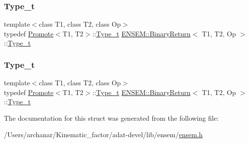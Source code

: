 \mbox{\label{structENSEM_1_1BinaryReturn_a8e4e01e2c9cd832cfe1a41a67305ac06}} 
\subsubsection{\texorpdfstring{Type\_t}{Type\_t}\hspace{0.1cm}{\footnotesize\ttfamily [2/3]}}
{\footnotesize\ttfamily template$<$class T1, class T2, class Op$>$ \\
typedef \mbox{\hyperlink{structENSEM_1_1Promote}{Promote}}$<$T1, T2$>$\+::\mbox{\hyperlink{structENSEM_1_1BinaryReturn_a8e4e01e2c9cd832cfe1a41a67305ac06}{Type\+\_\+t}} \mbox{\hyperlink{structENSEM_1_1BinaryReturn}{E\+N\+S\+E\+M\+::\+Binary\+Return}}$<$ T1, T2, Op $>$\+::\mbox{\hyperlink{structENSEM_1_1BinaryReturn_a8e4e01e2c9cd832cfe1a41a67305ac06}{Type\+\_\+t}}}

\mbox{\label{structENSEM_1_1BinaryReturn_a8e4e01e2c9cd832cfe1a41a67305ac06}} 
\subsubsection{\texorpdfstring{Type\_t}{Type\_t}\hspace{0.1cm}{\footnotesize\ttfamily [3/3]}}
{\footnotesize\ttfamily template$<$class T1, class T2, class Op$>$ \\
typedef \mbox{\hyperlink{structENSEM_1_1Promote}{Promote}}$<$T1, T2$>$\+::\mbox{\hyperlink{structENSEM_1_1BinaryReturn_a8e4e01e2c9cd832cfe1a41a67305ac06}{Type\+\_\+t}} \mbox{\hyperlink{structENSEM_1_1BinaryReturn}{E\+N\+S\+E\+M\+::\+Binary\+Return}}$<$ T1, T2, Op $>$\+::\mbox{\hyperlink{structENSEM_1_1BinaryReturn_a8e4e01e2c9cd832cfe1a41a67305ac06}{Type\+\_\+t}}}



The documentation for this struct was generated from the following file\+:\begin{DoxyCompactItemize}
\item 
/\+Users/archanar/\+Kinematic\+\_\+factor/adat-\/devel/lib/ensem/\mbox{\hyperlink{adat-devel_2lib_2ensem_2ensem_8h}{ensem.\+h}}\end{DoxyCompactItemize}
